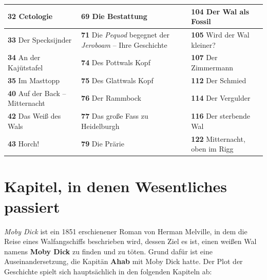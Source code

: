 \documentclass[a5paper,9pt,twoside=false]{extbook}
\begin{document}
{\begin{tabularx}{\textwidth}{X|X|X}
    \textbf{32} Cetologie & \textbf{69} Die Bestattung & \textbf{104} Der Wal als Fossil \\ \hline 
    \textbf{33} Der Specksijnder & \textbf{71} Die \textit{Pequod} begegnet der \textit{Jeroboam} -- Ihre Geschichte & \textbf{105} Wird der Wal kleiner? \\ \hline 
    \textbf{34} An der Kajütstafel & \textbf{74} Des Pottwals Kopf & \textbf{107} Der Zimmermann \\ \hline 
    \textbf{35} Im Masttopp & \textbf{75} Des Glattwals Kopf & \textbf{112} Der Schmied \\ \hline 
    \textbf{40} Auf der Back -- Mitternacht & \textbf{76} Der Rammbock & \textbf{114} Der Vergulder \\ \hline 
    \textbf{42} Das Weiß des Wals & \textbf{77} Das große Fass zu Heidelburgh & \textbf{116} Der sterbende Wal \\ \hline 
    \textbf{43} Horch! & \textbf{79} Die Prärie & \textbf{122} Mitternacht, oben im Rigg
\end{tabularx}
}
\normalsize


\newpage
\section*{Kapitel, in denen Wesentliches passiert}\label{relevantes}
\textit{Moby Dick} ist ein 1851 erschienener Roman von Herman Melville, in dem die Reise eines Walfangschiffs beschrieben wird, dessen Ziel es ist, einen weißen Wal namens \textbf{Moby Dick} zu finden und zu töten. Grund dafür ist eine Auseinandersetzung, die Kapitän \textbf{Ahab} mit Moby Dick hatte. Der Plot der Geschichte spielt sich hauptsächlich in den folgenden Kapiteln ab:
\footnotesize

\bigskip
\end{document}
